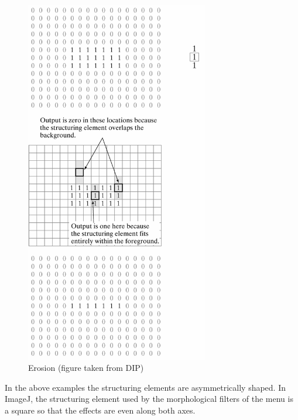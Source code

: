 \begin{figure}[htbp]
\begin{center}
\includegraphics[width=8cm]{fig/CMCIBasicCourse201102-img66.png}
\caption{ Erosion (figure taken from DIP)}
\label{fig:img66}
\end{center}
\end{figure}

In the above examples the structuring elements are asymmetrically shaped. In
ImageJ, the structuring element used by the morphological filters of the  menu is a square so that the
effects are even along both axes. 

